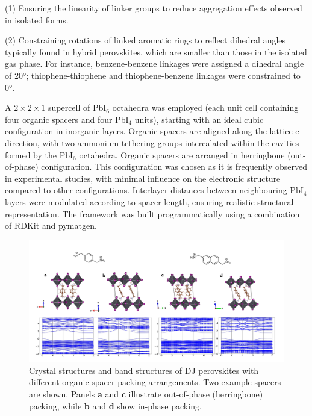 (1) Ensuring the linearity of linker groups to reduce aggregation effects observed in isolated forms. 

(2) Constraining rotations of linked aromatic rings to reflect dihedral angles typically found in hybrid perovskites, which are smaller than those in the isolated gas phase. For instance, benzene-benzene linkages were assigned a dihedral angle of 20°; thiophene-thiophene and thiophene-benzene linkages were constrained to 0°.

A $2\times2\times1$ supercell of PbI$_6$ octahedra was employed (each unit cell containing four organic spacers and four PbI$_4$ units), starting with an ideal cubic configuration in inorganic layers. Organic spacers are aligned along the lattice c direction, with two ammonium tethering groups intercalated within the cavities formed by the PbI$_6$ octahedra. Organic spacers are arranged in herringbone (out-of-phase) configuration. This configuration was chosen as it is frequently observed in experimental studies, with minimal influence on the electronic structure compared to other configurations. Interlayer distances between neighbouring PbI$_4$ layers were modulated according to spacer length, ensuring realistic structural representation. The framework was built programmatically using a combination of RDKit and pymatgen.

\begin{figure}[ht]
    \centering
    \includegraphics[width=\textwidth]{figures/methodology/figure3-10.png}
    \caption[Crystal structures and band structures of DJ perovskites with different organic spacer packing arrangements.]{Crystal structures and band structures of DJ perovskites with different organic spacer packing arrangements. Two example spacers are shown. Panels \textbf{a} and \textbf{c} illustrate out-of-phase (herringbone) packing, while \textbf{b} and \textbf{d} show in-phase packing.}
    \label{fig:figure3.10}
\end{figure}

